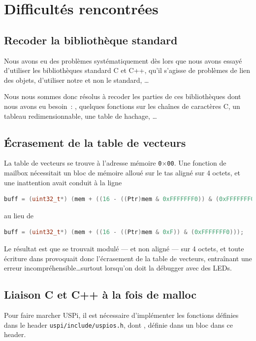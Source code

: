 \documentclass[11pt,a4paper]{article}
\newcommand{\hex}[1]{\texttt{0$\times$#1}}
\newcommand{\fname}[1]{\texttt{#1}} %
\begin{document}
\section{Difficultés rencontrées}


\subsection*{Recoder la bibliothèque standard}
Nous avons eu des problèmes systématiquement dès lors que nous avons essayé
d'utiliser les bibliothèques standard C et C++, qu'il s'agisse de problèmes de
lien des objets, d'utiliser notre  et non le 
standard, \ldots

Nous nous sommes donc résolus à recoder les parties de ces bibliothèques dont
nous avons eu besoin~: , quelques fonctions sur les chaînes de
caractères C, un tableau redimensionnable, une table de hachage, \ldots

\subsection*{Écrasement de la table de vecteurs}
La table de vecteurs se trouve à l'adresse mémoire \hex{00}. Une fonction de
mailbox nécessitait un bloc de mémoire alloué sur le tas aligné sur 4 octets,
et une inattention avait conduit à la ligne
\begin{lstlisting}[language=C++]
buff = (uint32_t*) (mem + ((16 - ((Ptr)mem & 0xFFFFFFF0)) & (0xFFFFFFF0)));
\end{lstlisting}

au lieu de
\begin{lstlisting}[language=C++]
buff = (uint32_t*) (mem + ((16 - ((Ptr)mem & 0xF)) & (0xFFFFFFF0)));
\end{lstlisting}

Le résultat est que  se trouvait modulé --- et non aligné --- sur 4
octets, et toute écriture dans  provoquait donc l'écrasement de la
table de vecteurs, entraînant une erreur incompréhensible\ldots surtout
lorsqu'on doit la débugger avec des LEDs.


\subsection*{Liaison C et C++ à la fois de malloc}
Pour faire marcher USPi, il est nécessaire d'implémenter les fonctions
définies dans le header \fname{uspi/include/uspios.h}, dont ,
définie dans un bloc  dans ce header. %
\end{document}
